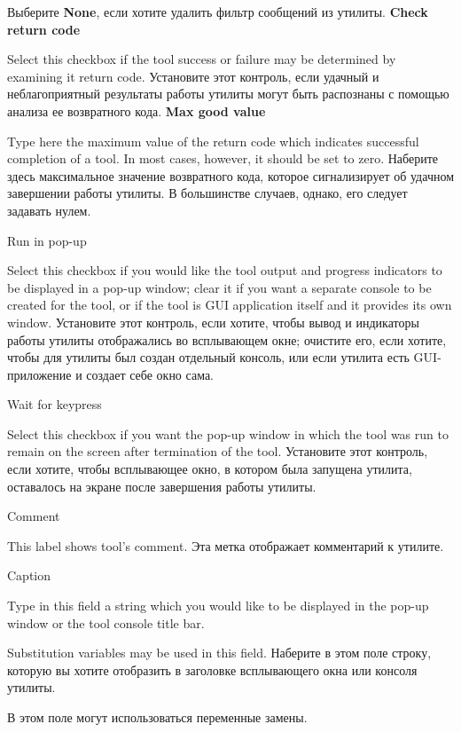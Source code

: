 Выберите {\bf None}, если хотите удалить фильтр сообщений из утилиты.
  \fi
{\bf Check return code}

\ifenglish
Select this checkbox if the tool success or failure may be determined by
examining it return code.
 \else
Установите этот контроль, если удачный и неблагоприятный результаты работы 
утилиты могут быть распознаны с помощью анализа ее возвратного кода.
  \fi
{\bf Max good value}

\ifenglish
Type here the maximum value of the return code which indicates successful
completion of a tool. In most cases, however, it should be set to zero.
 \else
Наберите здесь максимальное значение возвратного кода, которое сигнализирует
об удачном завершении работы утилиты. В большинстве случаев, однако, его следует
задавать нулем.
 \fi

\begin{popup}
\caption{Run in pop-up}

\ifenglish
Select this checkbox if you would like the tool output and progress
indicators to be displayed in a pop-up window; clear it if you want
a separate console to be created for the tool, or if the tool is GUI
application itself and it provides its own window.
 \else
Установите этот контроль, если хотите, чтобы вывод и индикаторы работы 
утилиты отображались во всплывающем окне; очистите его, если хотите, 
чтобы для утилиты был создан отдельный консоль, или если утилита 
есть GUI-приложение и создает себе окно сама. 
 \fi
\end{popup}

\begin{popup}
\caption{Wait for keypress}

\ifenglish
Select this checkbox if you want the pop-up window in which the tool was run
to remain on the screen after termination of the tool.
 \else
Установите этот контроль, если хотите, чтобы всплывающее окно, в котором была 
запущена утилита, оставалось на экране после завершения работы утилиты.
 \fi
\end{popup}

\begin{popup}
\caption{Comment}

\ifenglish
This label shows tool's comment.
 \else
Эта метка отображает комментарий к утилите.
 \fi
\end{popup}

\begin{popup}
\caption{Caption}

\ifenglish
Type in this field a string which you would like to be displayed in the
pop-up window or the tool console title bar.

Substitution variables may be used in this field.
 \else
Наберите в этом поле строку, которую вы хотите отобразить в заголовке
всплывающего окна или консоля утилиты.

В этом поле могут использоваться переменные замены.
 \fi
\end{popup}

